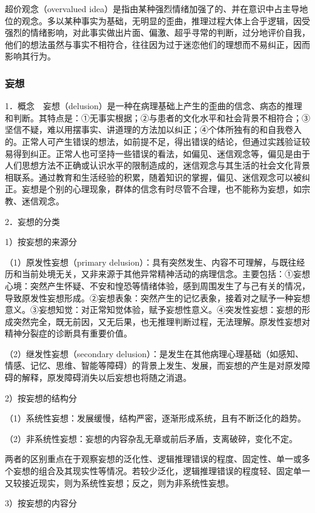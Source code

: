 超价观念（overvalued
idea）是指由某种强烈情绪加强了的、并在意识中占主导地位的观念。多以某种事实为基础，无明显的歪曲，推理过程大体上合乎逻辑，因受强烈的情绪影响，对此事实做出片面、偏激、超乎寻常的判断，过分地评价自我，他们的想法虽然与事实不相符合，往往因为过于迷恋他们的理想而不易纠正，因而影响其行为。

\subsubsection{妄想}

1．概念　妄想（delusion）是一种在病理基础上产生的歪曲的信念、病态的推理和判断。其特点是：①无事实根据；②与患者的文化水平和社会背景不相符合；③坚信不疑，难以用摆事实、讲道理的方法加以纠正；④个体所独有的和自我卷入的。正常人可产生错误的想法，如前提不足，得出错误的结论，但通过实践验证较易得到纠正。正常人也可坚持一些错误的看法，如偏见、迷信观念等，偏见是由于人们思想方法不正确或认识水平的限制造成的，迷信观念与其生活的社会文化背景相联系。通过教育和生活经验的积累，随着知识的掌握，偏见、迷信观念可以被纠正。妄想是个别的心理现象，群体的信念有时尽管不合理，也不能称为妄想，如宗教、迷信观念。

2．妄想的分类

1）按妄想的来源分

（1）原发性妄想（primary
delusion）：具有突然发生、内容不可理解，与既往经历和当前处境无关，又非来源于其他异常精神活动的病理信念。主要包括：①妄想心境：突然产生怀疑、不安和惶恐等情绪体验，感到周围发生了与己有关的情况，导致原发性妄想形成。②妄想表象：突然产生的记忆表象，接着对之赋予一种妄想意义。③妄想知觉：对正常知觉体验，赋予妄想性意义。④突发性妄想：妄想的形成突然完全，既无前因，又无后果，也无推理判断过程，无法理解。原发性妄想对精神分裂症的诊断具有重要价值。

（2）继发性妄想（secondary
delusion）：是发生在其他病理心理基础（如感知、情感、记忆、思维、智能等障碍）的背景上发生、发展，而妄想的产生是对原发障碍的解释，原发障碍消失以后妄想也将随之消退。

2）按妄想的结构分

（1）系统性妄想：发展缓慢，结构严密，逐渐形成系统，且有不断泛化的趋势。

（2）非系统性妄想：妄想的内容杂乱无章或前后矛盾，支离破碎，变化不定。

两者的区别重点在于观察妄想的泛化性、逻辑推理错误的程度、固定性、单一或多个妄想的组合及其现实性等情况。若较少泛化，逻辑推理错误的程度轻、固定单一又较接近现实，则为系统性妄想；反之，则为非系统性妄想。

3）按妄想的内容分

